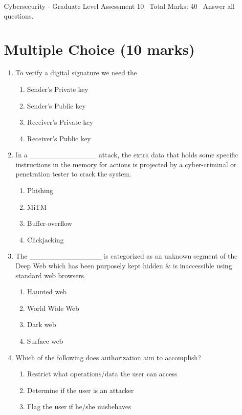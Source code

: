 \documentclass[12pt]{article}
\begin{document}
\begin{center}
Cybersecurity - Graduate Level Assessment 10 \
Total Marks: 40 \
Answer all questions.
\end{center}

\section*{Multiple Choice (10 marks)}
\begin{enumerate}[label=\arabic*.]
\item To verify a digital signature we need the
\begin{enumerate}[label=(\alph*)]
    \item Sender's Private key
    \item Sender's Public key
    \item Receiver's Private key
    \item Receiver's Public key
\end{enumerate}
\item In a \_\_\_\_\_\_\_\_\_\_\_\_\_ attack, the extra data that holds some specific instructions in the memory for actions is projected by a cyber-criminal or penetration tester to crack the system.
\begin{enumerate}[label=(\alph*)]
    \item Phishing
    \item MiTM
    \item Buffer-overflow
    \item Clickjacking
\end{enumerate}
\item The \_\_\_\_\_\_\_\_\_\_\_\_\_\_ is categorized as an unknown segment of the Deep Web which has been purposely kept hidden \& is inaccessible using standard web browsers.
\begin{enumerate}[label=(\alph*)]
    \item Haunted web
    \item World Wide Web
    \item Dark web
    \item Surface web
\end{enumerate}
\item Which of the following does authorization aim to accomplish?
\begin{enumerate}[label=(\alph*)]
    \item Restrict what operations/data the user can access
    \item Determine if the user is an attacker
    \item Flag the user if he/she misbehaves

\end{enumerate}
\end{enumerate}
\end{document}
